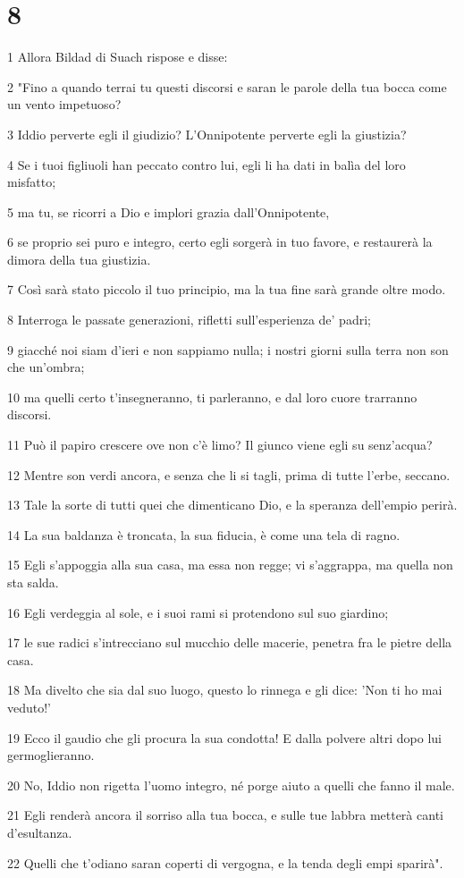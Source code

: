 \chapter{8}

\par 1 Allora Bildad di Suach rispose e disse:
\par 2 "Fino a quando terrai tu questi discorsi e saran le parole della tua bocca come un vento impetuoso?
\par 3 Iddio perverte egli il giudizio? L'Onnipotente perverte egli la giustizia?
\par 4 Se i tuoi figliuoli han peccato contro lui, egli li ha dati in balìa del loro misfatto;
\par 5 ma tu, se ricorri a Dio e implori grazia dall'Onnipotente,
\par 6 se proprio sei puro e integro, certo egli sorgerà in tuo favore, e restaurerà la dimora della tua giustizia.
\par 7 Così sarà stato piccolo il tuo principio, ma la tua fine sarà grande oltre modo.
\par 8 Interroga le passate generazioni, rifletti sull'esperienza de' padri;
\par 9 giacché noi siam d'ieri e non sappiamo nulla; i nostri giorni sulla terra non son che un'ombra;
\par 10 ma quelli certo t'insegneranno, ti parleranno, e dal loro cuore trarranno discorsi.
\par 11 Può il papiro crescere ove non c'è limo? Il giunco viene egli su senz'acqua?
\par 12 Mentre son verdi ancora, e senza che li si tagli, prima di tutte l'erbe, seccano.
\par 13 Tale la sorte di tutti quei che dimenticano Dio, e la speranza dell'empio perirà.
\par 14 La sua baldanza è troncata, la sua fiducia, è come una tela di ragno.
\par 15 Egli s'appoggia alla sua casa, ma essa non regge; vi s'aggrappa, ma quella non sta salda.
\par 16 Egli verdeggia al sole, e i suoi rami si protendono sul suo giardino;
\par 17 le sue radici s'intrecciano sul mucchio delle macerie, penetra fra le pietre della casa.
\par 18 Ma divelto che sia dal suo luogo, questo lo rinnega e gli dice: 'Non ti ho mai veduto!'
\par 19 Ecco il gaudio che gli procura la sua condotta! E dalla polvere altri dopo lui germoglieranno.
\par 20 No, Iddio non rigetta l'uomo integro, né porge aiuto a quelli che fanno il male.
\par 21 Egli renderà ancora il sorriso alla tua bocca, e sulle tue labbra metterà canti d'esultanza.
\par 22 Quelli che t'odiano saran coperti di vergogna, e la tenda degli empi sparirà".

